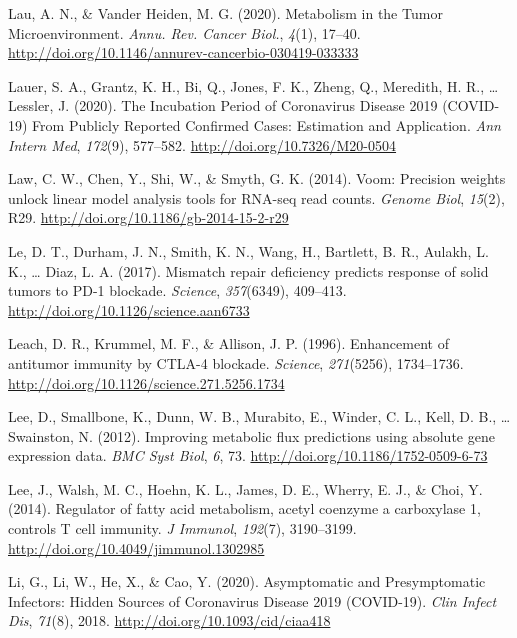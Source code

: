 \documentclass[12pt,twoside,openany,\mydriver]{thesis}  %
\begin{document}
\leavevmode\hypertarget{ref-lau_metabolism_2020}{}%
Lau, A. N., \& Vander Heiden, M. G. (2020). Metabolism in the Tumor Microenvironment. \emph{Annu. Rev. Cancer Biol.}, \emph{4}(1), 17--40. \url{http://doi.org/10.1146/annurev-cancerbio-030419-033333}

\leavevmode\hypertarget{ref-lauer_incubation_2020}{}%
Lauer, S. A., Grantz, K. H., Bi, Q., Jones, F. K., Zheng, Q., Meredith, H. R., \ldots{} Lessler, J. (2020). The Incubation Period of Coronavirus Disease 2019 (COVID-19) From Publicly Reported Confirmed Cases: Estimation and Application. \emph{Ann Intern Med}, \emph{172}(9), 577--582. \url{http://doi.org/10.7326/M20-0504}

\leavevmode\hypertarget{ref-law_voom_2014}{}%
Law, C. W., Chen, Y., Shi, W., \& Smyth, G. K. (2014). Voom: Precision weights unlock linear model analysis tools for RNA-seq read counts. \emph{Genome Biol}, \emph{15}(2), R29. \url{http://doi.org/10.1186/gb-2014-15-2-r29}

\leavevmode\hypertarget{ref-le_mismatch_2017}{}%
Le, D. T., Durham, J. N., Smith, K. N., Wang, H., Bartlett, B. R., Aulakh, L. K., \ldots{} Diaz, L. A. (2017). Mismatch repair deficiency predicts response of solid tumors to PD-1 blockade. \emph{Science}, \emph{357}(6349), 409--413. \url{http://doi.org/10.1126/science.aan6733}

\leavevmode\hypertarget{ref-leach_enhancement_1996}{}%
Leach, D. R., Krummel, M. F., \& Allison, J. P. (1996). Enhancement of antitumor immunity by CTLA-4 blockade. \emph{Science}, \emph{271}(5256), 1734--1736. \url{http://doi.org/10.1126/science.271.5256.1734}

\leavevmode\hypertarget{ref-lee_improving_2012}{}%
Lee, D., Smallbone, K., Dunn, W. B., Murabito, E., Winder, C. L., Kell, D. B., \ldots{} Swainston, N. (2012). Improving metabolic flux predictions using absolute gene expression data. \emph{BMC Syst Biol}, \emph{6}, 73. \url{http://doi.org/10.1186/1752-0509-6-73}

\leavevmode\hypertarget{ref-lee_regulator_2014}{}%
Lee, J., Walsh, M. C., Hoehn, K. L., James, D. E., Wherry, E. J., \& Choi, Y. (2014). Regulator of fatty acid metabolism, acetyl coenzyme a carboxylase 1, controls T cell immunity. \emph{J Immunol}, \emph{192}(7), 3190--3199. \url{http://doi.org/10.4049/jimmunol.1302985}

\leavevmode\hypertarget{ref-li_asymptomatic_2020}{}%
Li, G., Li, W., He, X., \& Cao, Y. (2020). Asymptomatic and Presymptomatic Infectors: Hidden Sources of Coronavirus Disease 2019 (COVID-19). \emph{Clin Infect Dis}, \emph{71}(8), 2018. \url{http://doi.org/10.1093/cid/ciaa418}
\end{document}
